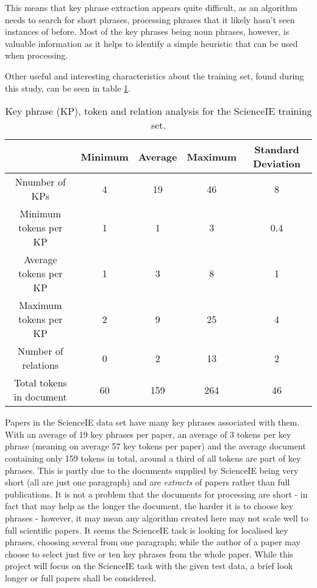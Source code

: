 This means that key phrase extraction appears quite difficult, as an algorithm needs to search for short phrases, processing phrases that it likely hasn't seen instances of before. Most of the key phrases being noun phrases, however, is valuable information as it helps to identify a simple heuristic that can be used when processing.

Other useful and interesting characteristics about the training set, found during this study, can be seen in table \ref{table:traininganalysis}. 

\begin{table}
	\centering
	\begin{tabular}{ c | c c c c }
		& \textbf{Minimum} & \textbf{Average} & \textbf{Maximum} & \textbf{Standard Deviation} \\
		\hline
		Nnumber of KPs & 4 & 19 & 46 & 8 \\
		Minimum tokens per KP & 1 & 1 & 3 & 0.4 \\
		Average tokens per KP & 1 & 3 & 8 & 1 \\
		Maximum tokens per KP & 2 & 9 & 25 & 4 \\
		Number of relations & 0 & 2 & 13 & 2 \\
		Total tokens in document & 60 & 159 & 264 & 46
	\end{tabular}
	\caption[ScienceIE Training Set Analysis]{Key phrase (KP), token and relation analysis for the ScienceIE training set.}
	\label{table:traininganalysis}
\end{table}

Papers in the ScienceIE data set have many key phrases associated with them. With an average of 19 key phrases per paper, an average of 3 tokens per key phrase (meaning on average 57 key tokens per paper) and the average document containing only 159 tokens in total, around a third of all tokens are part of key phrases. This is partly due to the documents supplied by ScienceIE being very short (all are just one paragraph) and are \textit{extracts} of papers rather than full publications. It is not a problem that the documents for processing are short - in fact that may help as the longer the document, the harder it is to choose key phrases \cite{Hasan2014} - however, it may mean any algorithm created here may not scale well to full scientific papers. It seems the ScienceIE task is looking for localised key phrases, choosing several from one paragraph; while the author of a paper may choose to select just five or ten key phrases from the whole paper. While this project will focus on the ScienceIE task with the given test data, a brief look longer or full papers shall be considered.
